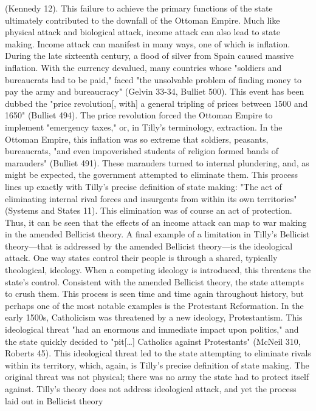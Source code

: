 \documentclass[letterpaper]{article}
\begin{document}
(Kennedy 12). This failure to achieve the primary functions of the state
ultimately contributed to the downfall of the Ottoman Empire. Much like
physical attack and biological attack, income attack can also lead to
state making. Income attack can manifest in many ways, one of which is
inflation. During the late sixteenth century, a flood of silver from
Spain caused massive inflation. With the currency devalued, many
countries whose "soldiers and bureaucrats had to be paid," faced "the
unsolvable problem of finding money to pay the army and bureaucracy"
(Gelvin 33-34, Bulliet 500). This event has been dubbed the "price
revolution[, with] a general tripling of prices between 1500 and 1650"
(Bulliet 494). The price revolution forced the Ottoman Empire to
implement "emergency taxes," or, in Tilly's terminology, extraction. In
the Ottoman Empire, this inflation was so extreme that soldiers,
peasants, bureaucrats, "and even impoverished students of religion
formed bands of marauders" (Bulliet 491). These marauders turned to
internal plundering, and, as might be expected, the government attempted
to eliminate them. This process lines up exactly with Tilly's precise
definition of state making: "The act of eliminating internal rival
forces and insurgents from within its own territories" (Systems and
States 11). This elimination was of course an act of protection. Thus,
it can be seen that the effects of an income attack can map to war
making in the amended Bellicist theory. A final example of a limitation
in Tilly's Bellicist theory---that is addressed by the amended Bellicist
theory---is the ideological attack. One way states control their people
is through a shared, typically theological, ideology. When a competing
ideology is introduced, this threatens the state's control. Consistent
with the amended Bellicist theory, the state attempts to crush them.
This process is seen time and time again throughout history, but perhaps
one of the most notable examples is the Protestant Reformation. In the
early 1500s, Catholicism was threatened by a new ideology,
Protestantism. This ideological threat "had an enormous and immediate
impact upon politics," and the state quickly decided to "pit[\ldots{}]
Catholics against Protestants" (McNeil 310, Roberts 45). This
ideological threat led to the state attempting to eliminate rivals
within its territory, which, again, is Tilly's precise definition of
state making. The original threat was not physical; there was no army
the state had to protect itself against. Tilly's theory does not address
ideological attack, and yet the process laid out in Bellicist theory
\end{document}
